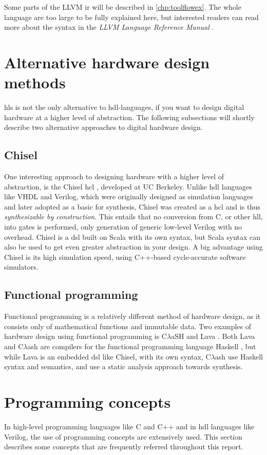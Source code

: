 Some parts of the LLVM \gls{ir} will be described in \cref{chp:toolflowex}. The whole language are too large to be fully explained here, but interested readers can read more about the syntax in the \textit{LLVM Language Reference Manual} \cite{llvmlangman}.

\section{Alternative hardware design methods}
\gls{hls} is not the only alternative to \gls{hdl}-languages, if you want to design digital hardware at a higher level of abstraction. The following subsections will shortly describe two alternative approaches to digital hardware design. 
\subsection{Chisel}
One interesting approach to designing hardware with a higher level of abstraction, is the Chisel \gls{hcl} \cite{bachrach2012chisel}, developed at UC Berkeley. Unlike \gls{hdl} languages like VHDL and Verilog, which were originally designed as simulation languages and later adopted as a basic for synthesis, Chisel was created as a \gls{hcl} and is thus \textit{synthesizable by construction}. This entails that no conversion from C, or other \gls{hll}, into gates is performed, only generation of generic low-level Verilog with no overhead. Chisel is a \gls{dsl} built on Scala \cite{odersky2004overview} with its own syntax, but Scala syntax can also be used to get even greater abstraction in your design. A big advantage using Chisel is its high simulation speed, using C++-based cycle-accurate software simulators.

\subsection{Functional programming}
Functional programming is a relatively different method of hardware design, as it consists only of mathematical functions and immutable data. Two examples of hardware design using functional programming is C$\lambda$aSH \cite{baaij2009clash} and Lava \cite{bjesse1998lava}. Both Lava and C$\lambda$ash are compilers for the functional programming language Haskell \cite{haskellonline}, but while Lava is an embedded \gls{dsl} like Chisel, with its own syntax, C$\lambda$ash use Haskell syntax and semantics, and use a static analysis approach towards synthesis.

\section{Programming concepts}
In high-level programming languages like C and C++ and in \gls{hdl} languages like Verilog, the use of programming concepts are extensively used. This section describes some concepts that are frequently referred throughout this report.
